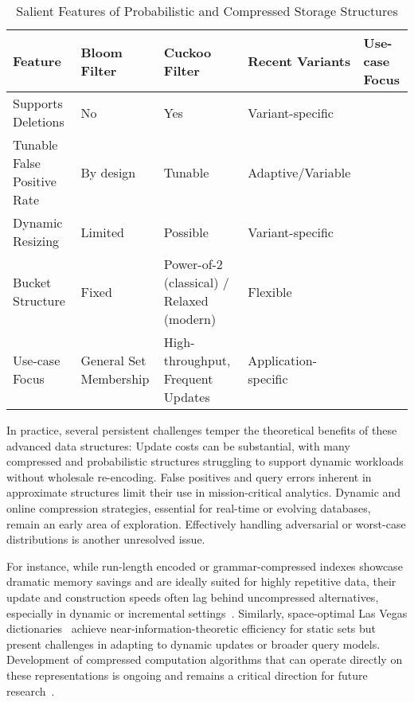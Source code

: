 \documentclass[sigconf]{acmart}
\begin{document}
\begin{table*}[htbp]
\centering
\caption{Salient Features of Probabilistic and Compressed Storage Structures}
\label{tab:filter_comparison}
\begin{adjustbox}{max width=\textwidth}
\begin{tabular}{lllll}
\toprule
Feature & Bloom Filter & Cuckoo Filter & Recent Variants & Use-case Focus \\
\midrule
Supports Deletions & No & Yes & Variant-specific & \\
Tunable False Positive Rate & By design & Tunable & Adaptive/Variable & \\
Dynamic Resizing & Limited & Possible & Variant-specific & \\
Bucket Structure & Fixed & Power-of-2 (classical) / Relaxed (modern) & Flexible & \\
Use-case Focus & General Set Membership & High-throughput, Frequent Updates & Application-specific & \\
\bottomrule
\end{tabular}
\end{adjustbox}
\end{table*}

In practice, several persistent challenges temper the theoretical benefits of these advanced data structures: Update costs can be substantial, with many compressed and probabilistic structures struggling to support dynamic workloads without wholesale re-encoding. False positives and query errors inherent in approximate structures limit their use in mission-critical analytics. Dynamic and online compression strategies, essential for real-time or evolving databases, remain an early area of exploration. Effectively handling adversarial or worst-case distributions is another unresolved issue. 

For instance, while run-length encoded or grammar-compressed indexes showcase dramatic memory savings and are ideally suited for highly repetitive data, their update and construction speeds often lag behind uncompressed alternatives, especially in dynamic or incremental settings~\cite{ref80,ref118}. Similarly, space-optimal Las Vegas dictionaries~\cite{ref82} achieve near-information-theoretic efficiency for static sets but present challenges in adapting to dynamic updates or broader query models. Development of compressed computation algorithms that can operate directly on these representations is ongoing and remains a critical direction for future research~\cite{ref118}. 
\end{document}
